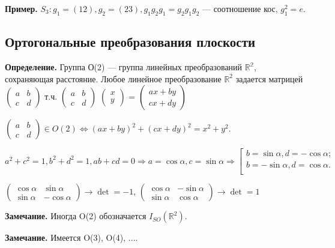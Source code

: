 \documentclass[12pt,a4paper]{article}
\begin{document}
\textbf{Пример.} $S_3: g_1 = (12), g_2 = (23), g_{1}g_{2}g_{1} = g_{2}g_{1}g_{2}$ --- соотношение кос, $g_{1}^2 = e$. 

\subsection{Ортогональные преобразования плоскости}

\textbf{Определение.} Группа О(2) --- группа линейных преобразований $\mathbb{R^2}$, сохраняющая расстояние. Любое линейное преобразование $\mathbb{R}^2$ задается матрицей $\begin{pmatrix}
	a&b\\
	c&d
\end{pmatrix}$ т.ч. $\begin{pmatrix}
a&b\\
c&d
\end{pmatrix}$ $\begin{pmatrix}
x\\
y
\end{pmatrix}$ = $\begin{pmatrix}
ax + by\\
cx + dy
\end{pmatrix}$

$\begin{pmatrix}
a&b\\
c&d
\end{pmatrix} \in O(2) \Leftrightarrow (ax + by)^2 + (cx + dy)^2 = x^2 + y^2.$

$a^2 + c^2 = 1, b^2 + d^2 = 1, ab + cd = 0 \Rightarrow a = \cos \alpha, c = \sin \alpha \Rightarrow \left[ 
\begin{gathered} 
b = \sin \alpha, d = -\cos \alpha; \\ 
b = -\sin \alpha, d = \cos \alpha. \\ 
\end{gathered} 
\right.$

$\begin{pmatrix}
\cos \alpha & \sin \alpha\\
\sin \alpha & -\cos \alpha
\end{pmatrix} \rightarrow \det = -1$, $\begin{pmatrix}
\cos \alpha & -\sin \alpha\\
\sin \alpha & \cos \alpha
\end{pmatrix} \rightarrow \det = 1$

\textbf{Замечание.} Иногда O(2) обозначается $I_{SO}(\mathbb{R}^2)$. 

\textbf{Замечание.} Имеется O(3), O(4), $...$. 
\end{document}
